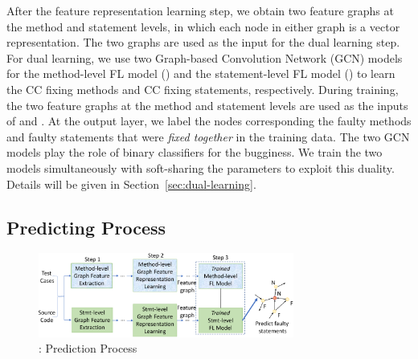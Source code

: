 After the feature representation learning step, we obtain two feature
graphs at the method and statement levels, in which each node in
either graph is a vector representation. The two graphs are used as
the input for the dual learning step. For dual learning, we use two
Graph-based Convolution Network (GCN) models~\cite{kipf2016semi} for
the method-level FL model () and the statement-level FL
model () to learn the CC fixing methods and CC fixing
statements, respectively. During training, the two feature graphs at
the method and statement levels are used as the inputs of
 and . At the output layer, we label the
nodes corresponding the faulty methods and faulty statements that were
{\em fixed together} in the training data. The two GCN models play the
role of binary classifiers for the bugginess.
%
We train the two models simultaneously with soft-sharing the
parameters to exploit this duality. Details will be given in
Section~\ref{sec:dual-learning}.





\subsection{Predicting Process}

\begin{figure}[t]
	\centering
	\includegraphics[width=3.3in]{graphs/overview-predict.png}
        \vspace{-10pt}
        \caption{{\tool}: Prediction Process}
	\label{predict-overview}
\end{figure}

